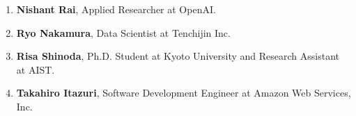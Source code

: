 \documentclass{article}
\begin{document}
\begin{enumerate}
    \item {\bf Nishant Rai}, Applied Researcher at OpenAI.

    \item {\bf Ryo Nakamura}, Data Scientist at Tenchijin Inc.

    \item {\bf Risa Shinoda}, Ph.D. Student at Kyoto University and Research Assistant at AIST.

    \item {\bf Takahiro Itazuri}, Software Development Engineer at Amazon Web Services, Inc.


\end{enumerate}
\end{document}

